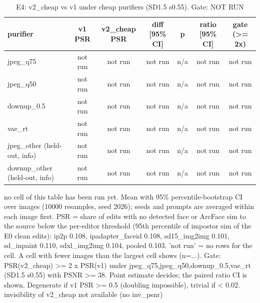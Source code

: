 \begin{table}[t]
\centering
\small
\begin{tabular}{lcccccc}
\toprule
purifier & v1 PSR & v2\_cheap PSR & diff [95\% CI] & p & ratio [95\% CI] & gate (>= 2x) \\
\midrule
jpeg\_q75 & not run & not run & not run & n/a & not run & not run \\
jpeg\_q50 & not run & not run & not run & n/a & not run & not run \\
downup\_0.5 & not run & not run & not run & n/a & not run & not run \\
vae\_rt & not run & not run & not run & n/a & not run & not run \\
jpeg\_other (held-out, info) & not run & not run & not run & n/a & not run & not run \\
downup\_other (held-out, info) & not run & not run & not run & n/a & not run & not run \\
\bottomrule
\end{tabular}
\caption{E4: v2\_cheap vs v1 under cheap purifiers (SD1.5 s0.55). Gate: NOT RUN}
\label{tab:e4}
\par\footnotesize no cell of this table has been run yet. Mean with 95\% percentile-bootstrap CI over images (10000 resamples, seed 2026); seeds and prompts are averaged within each image first. PSR = share of edits with no detected face or ArcFace sim to the source below the per-editor threshold (95th percentile of impostor sim of the E0 clean edits): ip2p 0.108, ipadapter\_faceid 0.108, sd15\_img2img 0.101, sd\_inpaint 0.110, sdxl\_img2img 0.104, pooled 0.103. 'not run' = no rows for the cell. A cell with fewer images than the largest cell shows (n=...). Gate: PSR(v2\_cheap) >= 2 x PSR(v1) under jpeg\_q75,jpeg\_q50,downup\_0.5,vae\_rt (SD1.5 s0.55) with PSNR >= 38. Point estimate decides; the paired ratio CI is shown. Degenerate if v1 PSR >= 0.5 (doubling impossible), trivial if < 0.02. invisibility of v2\_cheap not available (no inv\_psnr)
\end{table}
